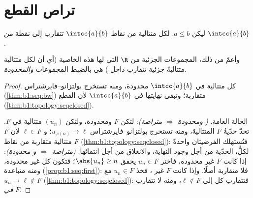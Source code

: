 \section{تراص القطع}

\begin{theorem}\label{thm:b1:topology:compact}
ليكن $a \leq b$. لكل متتالية من نقاط $\intcc{a}{b}$
 تتقارب إلى نقطة \emph{من}
$\intcc{a}{b}$.

وأعمّ من ذلك، المجموعات الجزئية من $\R$ التي لها هذه الخاصية (أي أن لكل
متتالية متتاليةً جزئية تتقارب داخل ) هي بالضبط
المجموعات \emph{ والمحدودة}.
\end{theorem}

\begin{proof}
كل متتالية في $\intcc{a}{b}$ محدودة، ومنه تستخرج بولتزانو--فايرشتراس
(\cref{thm:b1:seq:bw})  متقاربة؛ وتبقى نهايتها
في $\intcc{a}{b}$ لأن القطع 
(\cref{thm:b1:topology:seqclosed}).

الحالة العامة. \emph{( ومحدودة $\Rightarrow$ متراصة)}: لتكن
$F$  ومحدودة، ولتكن $(u_n)$ متتالية في $F$.
تحدّ حدّيةُ $F$ المتتاليةَ، ومنه تستخرج بولتزانو--فايرشتراس
$u_{\varphi(n)} \to \ell$؛ و $\ell \in F$ لأن $F$
  متتالية متقاربة من نقاط
$F$ (\cref{thm:b1:topology:seqclosed}): فتُستهلك الفرضيتان
واحدةً لكلٍّ، الحدّية من أجل وجود النهاية،
والانغلاق من أجل انتمائها. \emph{(متراصة $\Rightarrow$  و
محدودة)}: إذا كانت $F$ غير محدودة، فاختر $u_n \in F$ يحقق $\abs{u_n} \geq
n$؛ فتكون كل  غير محدودة، ومنه متباعدة
(\cref{prop:b1:seq:first}): فلا  متقاربة أصلًا. وإذا كانت $F$
غير ، فخذ $u_n \in F$ مع $u_n \to \ell \notin F$
(\cref{thm:b1:topology:seqclosed}): فتتقارب كل  إلى
$\ell \notin F$، ومنه لا  تتقارب \emph{في} $F$.
\end{proof}

